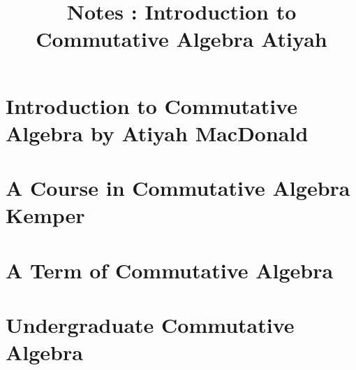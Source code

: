 \documentclass{article}
\title{Notes : Introduction to Commutative Algebra Atiyah}
\begin{document}
\tableofcontents
{}
\newpage\part{Introduction to Commutative Algebra by Atiyah MacDonald}

\newpage\part{A Course in Commutative Algebra Kemper}

\newpage\part{A Term of Commutative Algebra}

\newpage\part{Undergraduate Commutative Algebra}
\end{document}
